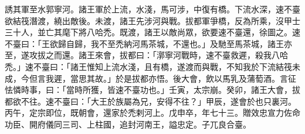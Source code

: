 \begin{pinyinscope}
誘其軍至水郭寧河。諸王軍於上流，水淺，馬可涉，中復有橋。下流水深，速不臺欲結筏潛渡，繞出敵後。未渡，諸王先涉河與戰。拔都軍爭橋，反為所乘，沒甲士三十人，並亡其麾下將八哈禿。既渡，諸王以敵尚眾，欲要速不臺還，徐圖之。速不臺曰：「王欲歸自歸，我不至禿納河馬茶城，不還也。」及馳至馬茶城，諸王亦至，遂攻拔之而還。諸王來會，拔都曰：「漷寧河戰時，速不臺救遲，殺我八哈禿。」速不臺曰：「諸王惟知上流水淺，且有橋，遂渡而與戰，不知我於下流結筏未成，今但言我遲，當思其故。」於是拔都亦悟。後大會，飲以馬乳及蒲萄酒。言征怯憐時事，曰：「當時所獲，皆速不臺功也。」壬寅，太宗崩。癸卯，諸王大會，拔都欲不往。速不臺曰：「大王於族屬為兄，安得不往？」甲辰，遂會於也只裏河。丙午，定宗即位，既朝會，還家於禿剌河上。戊申卒，年七十三。贈效忠宣力佐命功臣、開府儀同三司、上柱國，追封河南王，謚忠定。子兀良合臺。




\end{pinyinscope}
